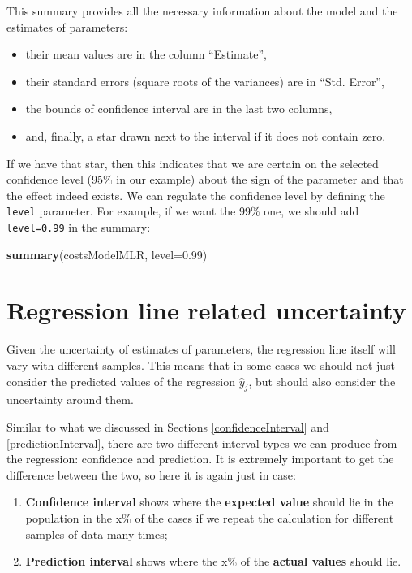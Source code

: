 \documentclass[
]{book}
\newenvironment{Shaded}{\begin{snugshade}}{\end{snugshade}}
\newcommand{\AttributeTok}[1]{\textcolor[rgb]{0.13,0.29,0.53}{#1}}
\newcommand{\FloatTok}[1]{\textcolor[rgb]{0.00,0.00,0.81}{#1}}
\newcommand{\FunctionTok}[1]{\textcolor[rgb]{0.13,0.29,0.53}{\textbf{#1}}}
\newcommand{\NormalTok}[1]{#1}
\providecommand{\tightlist}{%
  \setlength{\itemsep}{0pt}\setlength{\parskip}{0pt}}
\theoremstyle{definition}
\theoremstyle{definition}
\theoremstyle{definition}
\theoremstyle{definition}
\theoremstyle{remark}
\begin{document}
This summary provides all the necessary information about the model and the estimates of parameters:

\begin{itemize}
\tightlist
\item
  their mean values are in the column ``Estimate'',
\item
  their standard errors (square roots of the variances) are in ``Std. Error'',
\item
  the bounds of confidence interval are in the last two columns,
\item
  and, finally, a star drawn next to the interval if it does not contain zero.
\end{itemize}

If we have that star, then this indicates that we are certain on the selected confidence level (95\% in our example) about the sign of the parameter and that the effect indeed exists. We can regulate the confidence level by defining the \texttt{level} parameter. For example, if we want the 99\% one, we should add \texttt{level=0.99} in the summary:

\begin{Shaded}
\begin{Highlighting}[]
\FunctionTok{summary}\NormalTok{(costsModelMLR, }\AttributeTok{level=}\FloatTok{0.99}\NormalTok{)}
\end{Highlighting}
\end{Shaded}

\section{Regression line related uncertainty}\label{uncertaintyRegressionLine}

Given the uncertainty of estimates of parameters, the regression line itself will vary with different samples. This means that in some cases we should not just consider the predicted values of the regression \(\hat{y}_j\), but should also consider the uncertainty around them.

Similar to what we discussed in Sections \ref{confidenceInterval} and \ref{predictionInterval}, there are two different interval types we can produce from the regression: confidence and prediction. It is extremely important to get the difference between the two, so here it is again just in case:

\begin{enumerate}
\def\labelenumi{\arabic{enumi}.}
\tightlist
\item
  \textbf{Confidence interval} shows where the \textbf{expected value} should lie in the population in the x\% of the cases if we repeat the calculation for different samples of data many times;
\item
  \textbf{Prediction interval} shows where the x\% of the \textbf{actual values} should lie.
\end{enumerate}
\end{document}
